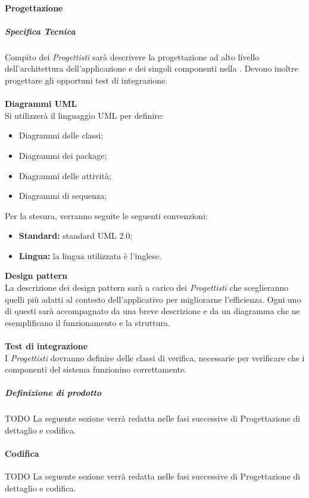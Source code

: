 			\paragraph{Progettazione}
				\subparagraph{Specifica Tecnica}
				Compito dei \emph{Progettisti} sarà descrivere la progettazione ad alto livello dell'architettura dell'applicazione e dei singoli componenti nella \docNameVersionST. Devono inoltre progettare gli opportuni test di integrazione.\\ \\
					\noindent
					\textbf{Diagrammi UML}\\
					Si utilizzerà il linguaggio UML per definire:
						\begin{itemize}
							\item Diagrammi delle classi;
							\item Diagrammi dei package;
							\item Diagrammi delle attività;
							\item Diagrammi di sequenza;
						\end{itemize}
					Per la stesura, verranno seguite le seguenti convenzioni:
						\begin{itemize}
							\item \textbf{Standard:} standard UML 2.0;
							\item \textbf{Lingua:} la lingua utilizzata è l'inglese.
						\end{itemize}
					\textbf{Design pattern}\\
					La descrizione dei design pattern sarà a carico dei \emph{Progettisti} che sceglieranno quelli più adatti al contesto dell'applicativo per migliorarne l'efficienza. Ogni uno di questi sarà accompagnato da una breve descrizione e da un diagramma che ne esemplificano il funzionamento e la struttura.\\ \\
					\textbf{Test di integrazione}\\
					I \emph{Progettisti} dovranno definire delle classi di verifica, necessarie per verificare che i componenti del sistema funzionino correttamente.\\ 

				\subparagraph{Definizione di prodotto}
				TODO \newline
				La seguente sezione verrà redatta nelle fasi successive di Progettazione di dettaglio e codifica.

			\paragraph{Codifica}
			TODO \newline
			La seguente sezione verrà redatta nelle fasi successive di Progettazione di dettaglio e codifica.


